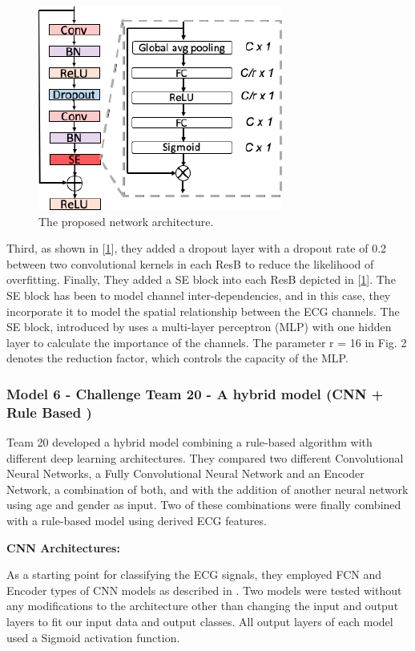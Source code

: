 \begin{figure}[H]
\centering
\includegraphics[scale=0.5]{img/team_two_network_2.png}
\caption{The proposed network architecture.}
\label{fig:team_two_network_2}
\end{figure}

Third, as shown in [\ref{fig:team_two_network_2}], they added a dropout layer with a dropout rate of 0.2 between two convolutional kernels in each ResB to reduce the likelihood of overfitting. Finally, They added a SE block into each ResB depicted in [\ref{fig:team_two_network_2}]. The SE block has been to model channel inter-dependencies, and in this case, they incorporate it to model the spatial relationship between the ECG channels. The SE block, introduced by \cite{Hu_2018_CVPR} uses a multi-layer perceptron (MLP) with one hidden layer to calculate the importance of the channels. The parameter r = 16 in Fig. 2 denotes the reduction factor, which controls the capacity of the MLP.


\subsubsection{Model 6 - Challenge Team 20 - A hybrid model (CNN + Rule Based )\cite{second_team} } \label{3model6}

Team 20 developed a hybrid model combining a rule-based algorithm with different deep learning architectures. They compared two different Convolutional Neural Networks, a Fully Convolutional Neural Network and an Encoder Network, a combination of both, and with the addition of another neural network using age and gender as input. Two of these combinations were finally combined with a rule-based model using derived ECG features. 

\textbf{CNN Architectures:}

As a starting point for classifying the ECG signals, they employed FCN and Encoder types of CNN models as described in \cite{ismail2019deep}. Two models were tested without any modifications to the architecture other than changing the input and output layers to fit our input data and output classes. All output layers of each model used a Sigmoid activation function.

